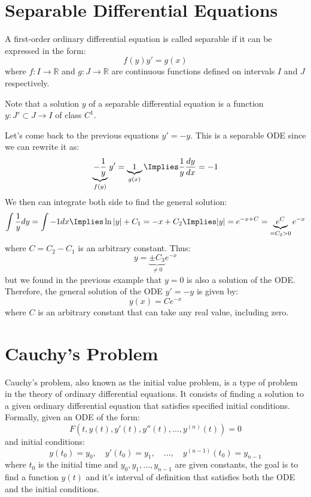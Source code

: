 \section{Separable Differential Equations}
\begin{definition}
    A first-order ordinary differential equation is called separable if it can be expressed in the form:
    \[
        f(y) y' = g(x)
    \]
    where $f: I \to \mathbb{R}$ and $g: J \to \mathbb{R}$ are continuous functions defined on intervals $I$ and $J$ respectively.
\end{definition}
Note that a solution $y$ of a separable differential equation is a function $y: J' \subset J \to I$ of class $C^1$.

\begin{eg}
    Let's come back to the previous equations $y' = -y$. This is a separable ODE since we can rewrite it as:
    \[
        \underbrace{-\frac{1}{y}}_{f(y)}y' = \underbrace{1}_{g(x)} \Implies \frac{1}{y} \frac{dy}{dx} = -1 
    \]
    We then can integrate both side to find the general solution:
    \[
        \int \frac{1}{y} dy = \int -1 dx \Implies \ln |y| + C_1 = -x + C_2 \Implies |y| = e^{-x + C} = \underbrace{e^C}_{= C_3 > 0} e^{-x}
    \]
    where $C = C_2 - C_1$ is an arbitrary constant. Thus:
    \[
        y = \underbrace{\pm C_3}_{\neq 0} e^{-x}
    \]
    but we found in the previous example that $y = 0$ is also a solution of the ODE. Therefore, the general solution of the ODE $y' = -y$ is given by:
    \[
        y(x) = Ce^{-x}
    \]
    where $C$ is an arbitrary constant that can take any real value, including zero.
\end{eg}

\section{Cauchy's Problem}
\begin{definition}
    Cauchy's problem, also known as the initial value problem, is a type of problem in the theory of ordinary differential equations. It consists of finding a solution to a given ordinary differential equation that satisfies specified initial conditions. Formally, given an ODE of the form:
    \[
        F\left(t, y(t), y'(t), y''(t), \ldots, y^{(n)}(t)\right) = 0
    \]
    and initial conditions:
    \[
        y(t_0) = y_0, \quad y'(t_0) = y_1, \quad \ldots, \quad y^{(n-1)}(t_0) = y_{n-1}
    \]
    where \( t_0 \) is the initial time and \( y_0, y_1, \ldots, y_{n-1} \) are given constants, the goal is to find a function \( y(t) \) and it's interval of definition that satisfies both the ODE and the initial conditions.
\end{definition}

